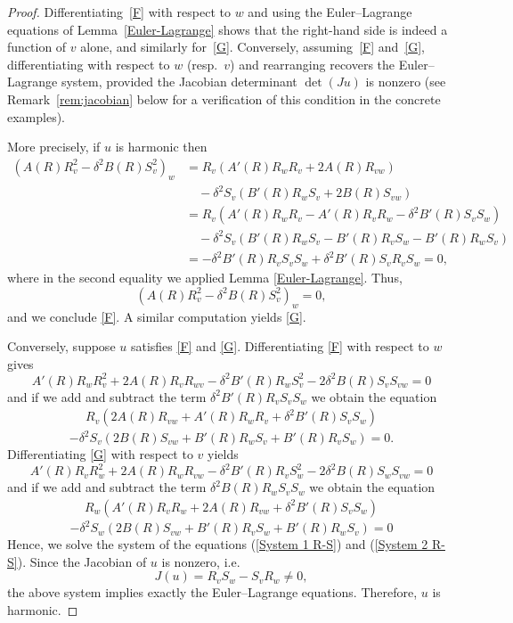 \documentclass[12pt]{amsart}
\begin{document}
\begin{proof}
Differentiating~\eqref{F} with respect to $w$ and using the
Euler--Lagrange equations of Lemma~\ref{Euler-Lagrange} shows that
the right-hand side is indeed a function of $v$ alone, and
similarly for~\eqref{G}. Conversely, assuming~\eqref{F}
and~\eqref{G}, differentiating with respect to $w$ (resp.\ $v$) and
rearranging recovers the Euler--Lagrange system, provided the
Jacobian determinant $\det(Ju)$ is nonzero (see Remark~\ref{rem:jacobian} below for a verification of this
condition in the concrete examples).

More precisely, if $u$ is harmonic then
		\begin{align*}
			\left( A(R)R_v^2 - \delta^2 B(R)S_v^2 \right)_w 
			&= 
			R_v\left( A'(R)R_wR_v + 2A(R)R_{vw} \right)
			\\
			&\quad - \delta^2 S_v\left( B'(R)R_wS_v + 2B(R)S_{vw} \right)
			\\
			&=
			R_v\left( A'(R)R_wR_v - A'(R)R_vR_w - \delta^2 B'(R)S_vS_w \right)
			\\
			&\quad - \delta^2 S_v\left( B'(R)R_wS_v - B'(R)R_vS_w - B'(R)R_wS_v \right)
			\\
			&=
			-\delta^2 B'(R) R_v S_v S_w 
			+ \delta^2 B'(R) S_v R_v S_w 
			= 0,
		\end{align*}
		where in the second equality we applied Lemma \ref{Euler-Lagrange}.  
		Thus,
		\[
		\left( A(R)R_v^2 - \delta^2 B(R)S_v^2 \right)_w = 0,
		\]
		and we conclude \eqref{F}.  A similar computation yields \eqref{G}. 
		
		\medskip
		
		Conversely, suppose $u$ satisfies \eqref{F} and \eqref{G}.  
		Differentiating \eqref{F} with respect to $w$ gives
		\[
		A'(R)R_wR_v^2 + 2A(R)R_vR_{wv} - \delta^2B'(R)R_wS_v^2 - 2\delta^2B(R)S_vS_{vw} = 0
		\]
		and if we add and subtract the term $\delta^2B'(R)R_vS_vS_w$ we obtain the equation
		\begin{align}\label{System 1 R-S}
			R_v\left(
			2A(R)R_{vw} + A'(R)R_wR_v + \delta^2B'(R)S_vS_w
			\right)
		\end{align}
		\[
		- \delta^2S_v 
		\left(
		2B(R)S_{vw} + B'(R)R_wS_v + B'(R)R_vS_w
		\right) = 0. 
		\]
		Differentiating \eqref{G} with respect to $v$ yields
		\[
		A'(R)R_vR_w^2 + 2A(R)R_wR_{vw} - \delta^2B'(R)R_vS_w^2 - 2\delta^2B(R)S_wS_{vw} = 0
		\]
		and if we add and subtract the term $\delta^2B(R)R_wS_vS_w$ we obtain the equation
		\begin{align}\label{System 2 R-S}
			R_w 
			\left(
			A'(R)R_vR_w + 2A(R)R_{vw} + \delta^2B'(R)S_vS_w
			\right)
		\end{align}
		\[
		-\delta^2 S_w
		\left(
		2B(R)S_{vw} + B'(R)R_vS_w + B'(R)R_wS_v
		\right) = 0
		\]
		Hence, we solve the system of the equations 
		(\ref{System 1 R-S}) and (\ref{System 2 R-S}).
		Since the Jacobian of $u$ is nonzero, i.e.
		\[
		J(u)=R_v S_w - S_v R_w \neq 0,
		\]
		the above system implies exactly the Euler--Lagrange equations. Therefore, $u$ is harmonic.
\end{proof}
\end{document}
